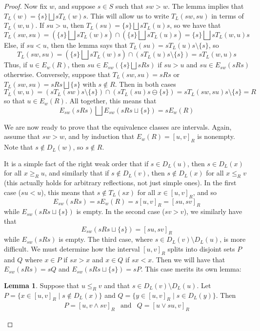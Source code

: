 \documentclass[11pt]{article}
\theoremstyle{definition}
\newtheorem{lemma}{Lemma}
\theoremstyle{definition}
\begin{document}
\begin{proof}
Now fix $w$, and suppose $s \in S$ such that $sw > w$. The lemma implies that $T_L(w) = \{s\} \bigsqcup sT_L(w)s$. This will allow us to write $T_L(sw, su)$ in terms of $T_L(w, u)$. If $su > u$, then $T_L(su) = \{s\} \bigsqcup sT_L(u)s$, so we have that
\[
T_L(sw, su) = (\{s\} \bigsqcup sT_L(w)s) \cap (\{s\} \bigsqcup sT_L(u)s) = \{s\} \bigsqcup sT_L(w, u)s
\]
Else, if $su < u$, then the lemma says that $T_L(su) = sT_L(u)s \setminus \{s\}$, so
\[
T_L(sw, su) = (\{s\} \bigsqcup sT_L(w)s) \cap (sT_L(u)s \setminus \{s\}) = sT_L(w, u)s
\]
Thus, if $u \in E_w(R)$, then $su \in E_{sw}(\{s\} \bigsqcup sRs)$ if $su > u$ and $su \in E_{sw}(sRs)$ otherwise. Conversely, suppose that $T_L(sw, su) = sRs$ or $T_L(sw, su) = sRs \bigsqcup \{s\}$ with $s \notin R$. Then in both cases
\[
T_L(w, u) = (sT_L(sw)s \setminus \{s\}) \cap (sT_L(su)s \ominus \{s\}) = sT_L(sw, su)s \setminus \{s\} = R
\]
so that $u \in E_w(R)$. All together, this means that
\begin{equation}\label{split}
E_{sw}(sRs) \bigsqcup E_{sw}(sRs \sqcup \{s\}) = sE_w(R)
\end{equation}

We are now ready to prove that the equivalence classes are intervals. Again, assume that $sw > w$, and by induction that $E_w(R) = [u, v]_R$ is nonempty. Note that $s \notin D_L(w)$, so $s \notin R$.

It is a simple fact of the right weak order that if $s \in D_L(u)$, then $s \in D_L(x)$ for all $x \geq_R u$, and similarly that if $s \notin D_L(v)$, then $s \notin D_L(x)$ for all $x \leq_R v$ (this actually holds for arbitrary reflections, not just simple ones). In the first case ($su < u$), this means that $s \notin T_L(sx)$ for all $x \in [u, v]_R$, and so
\[
E_{sw}(sRs) = sE_w(R) = s[u, v]_R = [su, sv]_R
\]
while $E_{sw}(sRs \sqcup \{s\})$ is empty. In the second case ($sv > v$), we similarly have that
\[
E_{sw}(sRs \sqcup \{s\}) = [su, sv]_R
\]
while $E_{sw}(sRs)$ is empty. The third case, where $s \in D_L(v) \setminus D_L(u)$, is more difficult. We must determine how the interval $[u, v]_R$ splits into disjoint sets $P$ and $Q$ where $x \in P$ if $sx > x$ and $x \in Q$ if $sx < x$. Then we will have that $E_{sw}(sRs) = sQ$ and $E_{sw}(sRs \sqcup \{s\}) = sP$. This case merits its own lemma:

\begin{lemma}
\label{ldescent}
Suppose that $u \leq_R v$ and that $s \in D_L(v) \setminus D_L(u)$. Let $P = \{x \in [u, v]_R \mid s \notin D_L(x)\}$ and $Q = \{y \in [u, v]_R \mid s \in D_L(y)\}$. Then
\[
\begin{array}{lcr}
P = [u, v \land sv]_R & \text{and} & Q = [u \lor su, v]_R
\end{array}
\]
\end{lemma}


\end{proof}
\end{document}
